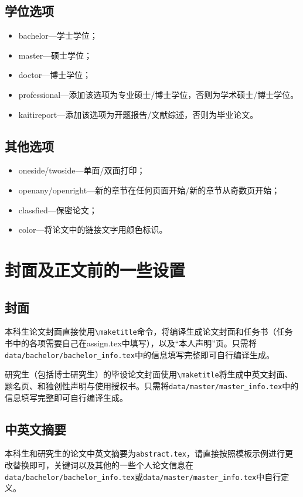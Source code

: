 \subsection{学位选项}
    \begin{itemize}
        \item bachelor---学士学位；
        \item master---硕士学位；
        \item doctor---博士学位；
        \item professional---添加该选项为专业硕士\slash 博士学位，否则为学术硕士\slash 博士学位。
        \item kaitireport---添加该选项为开题报告\slash 文献综述，否则为毕业论文。
    \end{itemize}

\subsection{其他选项}
    \begin{itemize}
        \item oneside\slash twoside---单面\slash 双面打印；
        \item openany\slash openright---新的章节在任何页面开始\slash 新的章节从奇数页开始；
        \item classfied---保密论文；
        \item color---将论文中的链接文字用颜色标识。
    \end{itemize}

\section{封面及正文前的一些设置}
\subsection{封面}
本科生论文封面直接使用\texttt{\textbackslash maketitle}命令，将编译生成论文封面和任务书（任务书中的各项需要自己在assign.tex中填写），以及“本人声明”页。只需将\texttt{data/bachelor/bachelor\_info.tex}中的信息填写完整即可自行编译生成。

研究生（包括博士研究生）的毕设论文封面使用\texttt{\textbackslash maketitle}将生成中英文封面、题名页、和独创性声明与使用授权书。只需将\texttt{data/master/master\_info.tex}中的信息填写完整即可自行编译生成。

\subsection{中英文摘要}
本科生和研究生的论文中英文摘要为\texttt{abstract.tex}，请直接按照模板示例进行更改替换即可，关键词以及其他的一些个人论文信息在\texttt{data/bachelor/bachelor\_info.tex}或\texttt{data/master/master\_info.tex}中自行定义。

